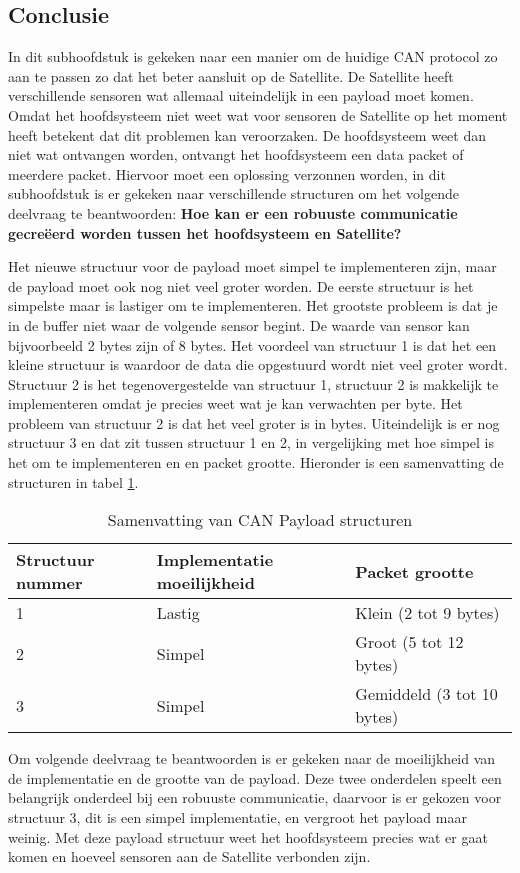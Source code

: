 \subsection{Conclusie}
In dit subhoofdstuk is gekeken naar een manier om de huidige CAN protocol zo aan te passen zo dat het beter aansluit op de Satellite. De Satellite heeft verschillende sensoren wat allemaal uiteindelijk in een payload moet komen. Omdat het hoofdsysteem niet weet wat voor sensoren de Satellite op het moment heeft betekent dat dit problemen kan veroorzaken. De hoofdsysteem weet dan niet wat ontvangen worden, ontvangt het hoofdsysteem een data packet of meerdere packet. Hiervoor moet een oplossing verzonnen worden, in dit subhoofdstuk is er gekeken naar verschillende structuren om het volgende deelvraag te beantwoorden: \textbf{Hoe kan er een robuuste  communicatie gecreëerd worden tussen het hoofdsysteem en Satellite?} \newline

\noindent Het nieuwe structuur voor de payload moet simpel te implementeren zijn, maar de payload moet ook nog niet veel groter worden. De eerste structuur is het simpelste maar is lastiger om te implementeren. Het grootste probleem is dat je in de buffer niet waar de volgende sensor begint. De waarde van sensor kan bijvoorbeeld 2 bytes zijn of 8 bytes. Het voordeel van structuur 1 is dat het een kleine structuur is waardoor de data die opgestuurd wordt niet veel groter wordt. Structuur 2 is het tegenovergestelde van structuur 1, structuur 2 is makkelijk te implementeren omdat je precies weet wat je kan verwachten per byte. Het probleem van structuur 2 is dat het veel groter is in bytes. Uiteindelijk is er nog structuur 3 en dat zit tussen structuur 1 en 2, in vergelijking met hoe simpel is het om te implementeren en en packet grootte. Hieronder is een samenvatting de structuren in tabel \ref{tab:samenvattingstructuur}.

\begin{table}[h!]
	\centering
	\caption{Samenvatting van CAN Payload structuren}
	\label{tab:samenvattingstructuur}
	\begin{tabular}{lll}
	\toprule
		Structuur nummer & Implementatie moeilijkheid & Packet grootte             \\ \midrule
		1                & Lastig                     & Klein (2 tot 9 bytes)      \\
		2                & Simpel                     & Groot (5 tot 12 bytes)     \\
		3                & Simpel                     & Gemiddeld (3 tot 10 bytes) \\ \bottomrule
	\end{tabular}%
\end{table}

\noindent Om volgende deelvraag te beantwoorden is er gekeken naar de moeilijkheid van de implementatie en de grootte van de payload. Deze twee onderdelen speelt een belangrijk onderdeel bij een robuuste communicatie, daarvoor is er gekozen voor structuur 3, dit is een simpel implementatie, en vergroot het payload maar weinig. Met deze payload structuur weet het hoofdsysteem precies wat er gaat komen en hoeveel sensoren aan de Satellite verbonden zijn.
